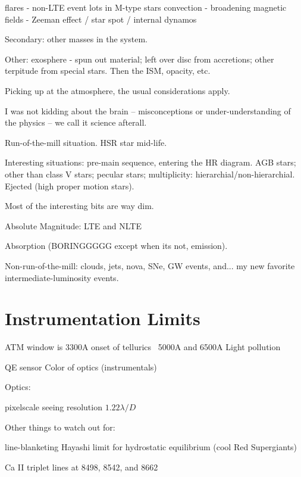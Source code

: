 flares          - non-LTE event lots in M-type stars
convection      - broadening 
magnetic fields - Zeeman effect / star spot / internal dynamos


Secondary: other masses in the system.

Other: exosphere - spun out material; left over disc from accretions;
other terpitude from special stars. Then the ISM, opacity, etc.

Picking up at the atmosphere, the usual considerations apply.

I was not kidding about the brain -- misconceptions or under-understanding
of the physics -- we call it science afterall.

Run-of-the-mill situation. HSR star mid-life.

Interesting situations: pre-main sequence, entering the HR diagram.
AGB stars; other than class V stars; pecular stars; multiplicity:
hierarchial/non-hierarchial. Ejected (high proper motion stars).

Most of the interesting bits are way dim. 

Absolute Magnitude: LTE and NLTE

Absorption (BORINGGGGG except when its not, emission).

Non-run-of-the-mill: clouds, jets, nova, SNe, GW events, and...
my new favorite intermediate-luminosity events.

\section{Instrumentation Limits}

ATM window is 3300A 
onset of tellurics ~5000A and 6500A
Light pollution

QE sensor
Color of optics (instrumentals)


Optics:

pixelscale
seeing
resolution $1.22\lambda/D$

Other things to watch out for:

line-blanketing
Hayashi limit for hydrostatic equilibrium (cool Red Supergiants)



Ca II triplet lines at 8498, 8542, and 8662







  



  



